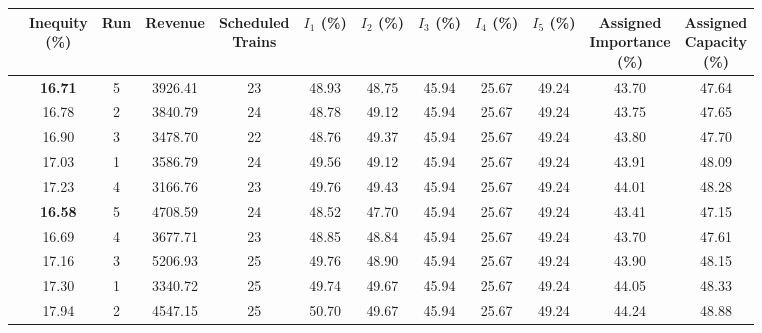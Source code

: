 \documentclass[preprint,12pt]{elsarticle}
\begin{document}
\begin{table}[htbp]
\centering
\begin{adjustbox}{max width=\textwidth}
\begin{tabular}{|c|c|c|c|c|c|c|c|c|c|c|c|}
\cline{2-12}
 \multicolumn{1}{c|}{} & \makecell{\textbf{Inequity} \\ \textbf{(\%)}} & \textbf{Run} & \textbf{Revenue} & \makecell{\textbf{Scheduled} \\ \textbf{Trains}} & \makecell{\textbf{$I_1$} \\ \textbf{(\%)}} & \makecell{\textbf{$I_2$}  \\ \textbf{(\%)}} & \makecell{\textbf{$I_3$}  \\ \textbf{(\%)}} & \makecell{\textbf{$I_4$} \\ \textbf{(\%)}} & \makecell{\textbf{$I_5$} \\ \textbf{(\%)}} & \makecell{\textbf{Assigned} \\ \textbf{Importance} \\ \textbf{(\%)}} & \makecell{\textbf{Assigned} \\ \textbf{Capacity} \\ \textbf{(\%)}} \\ \cline{2-12} \hline

\parbox[t]{2mm}{} & \textbf{16.71}     & 5 & 3926.41 & 23 & 48.93 & 48.75 & 45.94 & 25.67 & 49.24 & 43.70 & 47.64 \\
& 16.78 & 2 & 3840.79 & 24 & 48.78 & 49.12 & 45.94 & 25.67 & 49.24 & 43.75 & 47.65 \\
& 16.90 & 3 & 3478.70 & 22 & 48.76 & 49.37 & 45.94 & 25.67 & 49.24 & 43.80 & 47.70 \\
& 17.03 & 1 & 3586.79 & 24 & 49.56 & 49.12 & 45.94 & 25.67 & 49.24 & 43.91 & 48.09 \\
& 17.23 & 4 & 3166.76 & 23 & 49.76 & 49.43 & 45.94 & 25.67 & 49.24 & 44.01 & 48.28 \\ \hline

\parbox[t]{2mm}{} & \textbf{16.58} & 5 & 4708.59 & 24 & 48.52 & 47.70 & 45.94 & 25.67 & 49.24 & 43.41 & 47.15 \\
& 16.69 & 4 & 3677.71 & 23 & 48.85 & 48.84 & 45.94 & 25.67 & 49.24 & 43.70 & 47.61 \\
& 17.16 & 3 & 5206.93 & 25 & 49.76 & 48.90 & 45.94 & 25.67 & 49.24 & 43.90 & 48.15 \\
& 17.30 & 1 & 3340.72 & 25 & 49.74 & 49.67 & 45.94 & 25.67 & 49.24 & 44.05 & 48.33 \\
& 17.94 & 2 & 4547.15 & 25 & 50.70 & 49.67 & 45.94 & 25.67 & 49.24 & 44.24 & 48.88 \\ \hline


\end{tabular}
\end{adjustbox}
\end{table}
\end{document}
